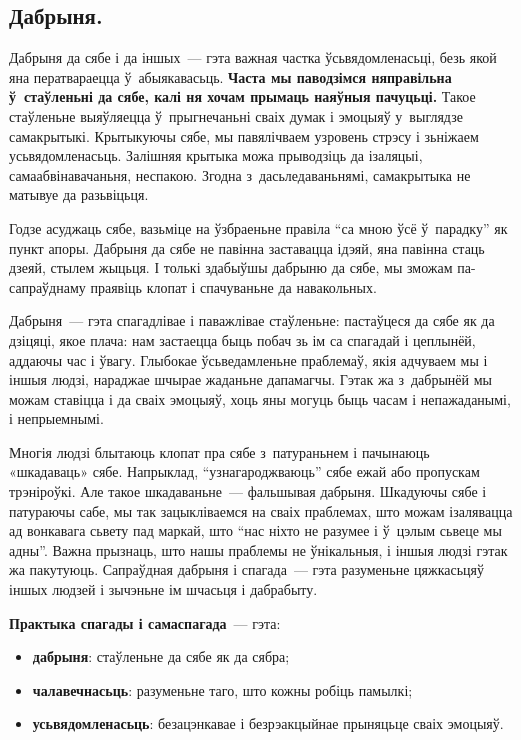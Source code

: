 \subsection*{Дабрыня.}

Дабрыня да сябе і да іншых~--- гэта важная частка ўсьвядомленасьці, безь якой яна ператвараецца ў~абыякавасьць. \textbf{Часта мы паводзімся няправільна ў~стаўленьні да сябе, калі ня хочам прымаць наяўныя пачуцьці.} Такое стаўленьне выяўляецца ў~прыгнечаньні сваіх думак і эмоцыяў у~выглядзе самакрытыкі. Крытыкуючы сябе, мы павялічваем узровень стрэсу і зьніжаем усьвядомленасьць. Залішняя крытыка можа прыводзіць да ізаляцыі, самаабвінавачаньня, неспакою. Згодна з~дасьледаваньнямі, самакрытыка не матывуе да разьвіцьця.

Годзе асуджаць сябе, вазьміце на ўзбраеньне правіла ``са мною ўсё ў~парадку'' як пункт апоры. Дабрыня да сябе не павінна заставацца ідэяй, яна павінна стаць дзеяй, стылем жыцьця. І толькі здабыўшы дабрыню да сябе, мы зможам па-сапраўднаму праявіць клопат і спачуваньне да навакольных.

Дабрыня~--- гэта спагадлівае і паважлівае стаўленьне: пастаўцеся да сябе як да дзіцяці, якое плача: нам застаецца быць побач зь ім са спагадай і цеплынёй, аддаючы час і ўвагу. Глыбокае ўсьведамленьне праблемаў, якія адчуваем мы і іншыя людзі, нараджае шчырае жаданьне дапамагчы. Гэтак жа з~дабрынёй мы можам ставіцца і да сваіх эмоцыяў, хоць яны могуць быць часам і непажаданымі, і непрыемнымі.

Многія людзі блытаюць клопат пра сябе з~патураньнем і пачынаюць «шкадаваць» сябе. Напрыклад, ``узнагароджваюць'' сябе ежай або пропускам трэніроўкі. Але такое шкадаваньне~--- фальшывая дабрыня. Шкадуючы сябе і патураючы сабе, мы так зацыкліваемся на сваіх праблемах, што можам ізалявацца ад вонкавага сьвету пад маркай, што ``нас ніхто не разумее і ў~цэлым сьвеце мы адны''. Важна прызнаць, што нашы праблемы не ўнікальныя, і іншыя людзі гэтак жа пакутуюць. Сапраўдная дабрыня і спагада~--- гэта разуменьне цяжкасьцяў іншых людзей і зычэньне ім шчасьця і дабрабыту.

\textbf{Практыка спагады і самаспагада}~--- гэта: 
\begin{itemize}
  \item \textbf{дабрыня}: стаўленьне да сябе як да сябра;
  \item \textbf{чалавечнасьць}: разуменьне таго, што кожны робіць памылкі;
  \item \textbf{усьвядомленасьць}: безацэнкавае і безрэакцыйнае прыняцьце сваіх эмоцыяў.
\end{itemize}

